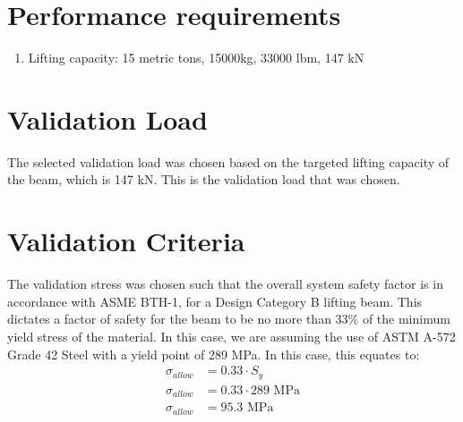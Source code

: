 \section{Performance requirements}
\begin{enumerate}
\item Lifting capacity: 15 metric tons, 15000kg, 33000 lbm, 147 kN
\end{enumerate}
\section{Validation Load}
The selected validation load was chosen based on the targeted lifting capacity of the beam, which is 147 kN. This is the validation load that was chosen. 
\section{Validation Criteria}
The validation stress was chosen such that the overall system safety factor is in accordance with ASME BTH-1, for a Design Category B lifting beam. This dictates a factor of safety for the beam to be no more than 33\% of the minimum yield stress of the material. In this case, we are assuming the use of ASTM A-572 Grade 42 Steel with a yield point of 289 MPa. 
In this case, this equates to:
\begin{align*}
	\sigma_{\mathit{allow}} &= 0.33 \cdot S_{y}\\
	\sigma_{allow} &= 0.33 \cdot 289  \text{ MPa} \\
	\sigma_{allow} &= 95.3 \text{ MPa}
\end{align*}
